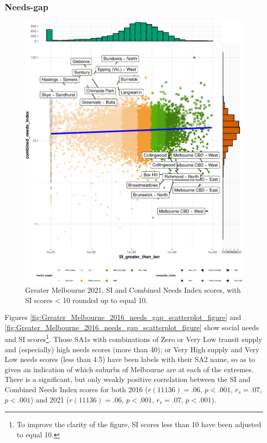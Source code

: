 \documentclass[preprint, 3p,
authoryear]{elsarticle} %
\begin{document}
\hypertarget{needs-gap}{%
\subsubsection{Needs-gap}\label{needs-gap}}

\begin{figure}
\centering
\includegraphics{ReynoldsCurrieQu2024_files/figure-latex/Greater_Melbourne_2021_needs_gap_scatterplot_figure-1.pdf}
\caption{Greater Melbourne 2021, SI and Combined Needs Index scores,
with SI scores \textless{} 10 rounded up to equal 10.}
\end{figure}

Figures \ref{fig:Greater_Melbourne_2016_needs_gap_scatterplot_figure}
and \ref{fig:Greater_Melbourne_2016_needs_gap_scatterplot_figure} show
social needs and SI scores\footnote{To improve the clarity of the
  figure, SI scores less than 10 have been adjusted to equal 10.}. Those
SA1s with combinations of Zero or Very Low transit supply and
(especially) high needs scores (more than 40); or Very High supply and
Very Low needs scores (less than 4.5) have been labels with their SA2
name, so as to given an indication of which suburbs of Melbourne are at
each of the extremes. There is a significant, but only weakly positive
correlation between the SI and Combined Needs Index scores for both 2016
(\(r(11136) = .06\), \(p < .001\), \(r_s =.07\), \(p < .001\)) and 2021
(\(r(11136) = .06\), \(p < .001\), \(r_s =.07\), \(p < .001\)).
\end{document}

